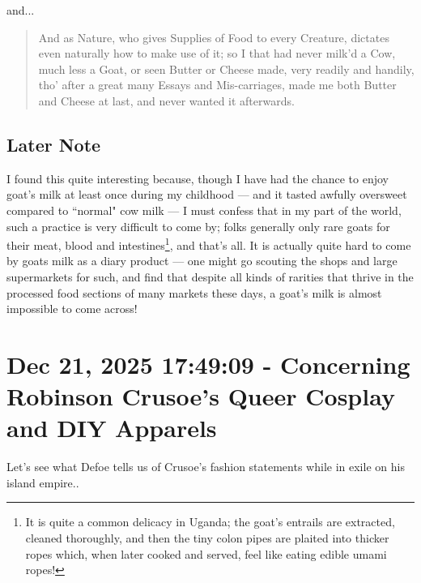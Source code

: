 \documentclass[a4paper]{article}
\begin{document}
and...

\noindent
\begin{minipage}{1\textwidth}
\vspace{1em}
\begin{quotation}
{\ttfamily

And as Nature, who gives Supplies of Food to every Creature, dictates even naturally how to make use of it; so I that had never milk’d a Cow, much less a Goat, or seen Butter or Cheese made, very readily and handily, tho’ after a great many Essays and Mis-carriages, made me both Butter and Cheese at last, and never wanted it afterwards.

}
\end{quotation}
\vspace{1em}
\end{minipage}




\subsection{Later Note}


I found this quite interesting because, though I have had the chance to enjoy goat's milk at least once during my childhood --- and it tasted awfully oversweet compared to ``normal" cow milk --- I must confess that in my part of the world, such a practice is very difficult to come by; folks generally only rare goats for their meat, blood and intestines\footnote{It is quite a common delicacy in Uganda; the goat's entrails are extracted, cleaned thoroughly, and then the tiny colon pipes are plaited into thicker ropes which, when later cooked and served, feel like eating edible umami ropes!}, and that's all. It is actually quite hard to come by goats milk as a diary product --- one might go scouting the shops and large supermarkets for such, and find that despite all kinds of rarities that thrive in the processed food sections of many markets these days, a goat's milk is almost impossible to come across!





\section{Dec 21, 2025 17:49:09 - Concerning Robinson Crusoe's Queer Cosplay and DIY Apparels}
\label{SEC39}


Let's see what Defoe tells us of Crusoe's fashion statements while in exile on his island empire..
\end{document}
